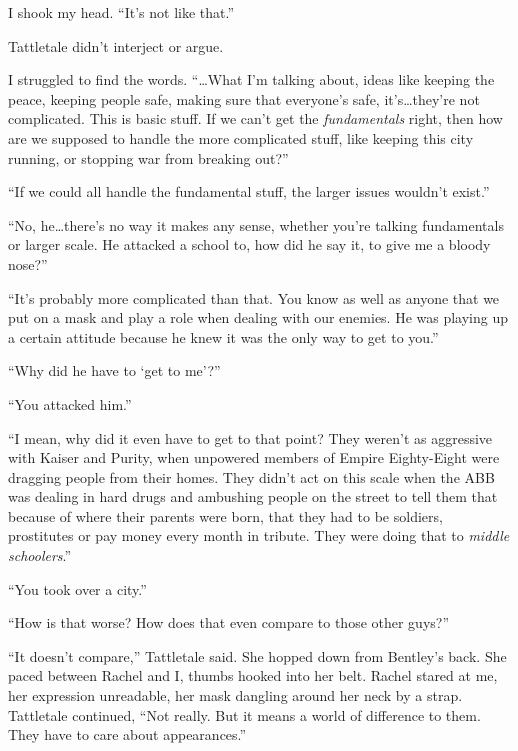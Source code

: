 I shook my head.  ``It's not like that.''



Tattletale didn't interject or argue.



I struggled to find the words.  ``\ldots{}What I'm talking about, ideas like keeping the peace, keeping people safe, making sure that everyone's safe, it's\ldots they're not complicated.  This is basic stuff.  If we can't get the \emph{fundamentals }right, then how are we supposed to handle the more complicated stuff, like keeping this city running, or stopping war from breaking out?''



``If we could all handle the fundamental stuff, the larger issues wouldn't exist.''



``No, he\ldots there's no way it makes any sense, whether you're talking fundamentals or larger scale.  He attacked a school to, how did he say it, to give me a bloody nose?''



``It's probably more complicated than that.  You know as well as anyone that we put on a mask and play a role when dealing with our enemies.  He was playing up a certain attitude because he knew it was the only way to get to you.''



``Why did he have to `get to me'?''



``You attacked him.''



``I mean, why did it even have to get to that point?  They weren't as aggressive with Kaiser and Purity, when unpowered members of Empire Eighty-Eight were dragging people from their homes.  They didn't act on this scale when the ABB was dealing in hard drugs and ambushing people on the street to tell them that because of where their parents were born, that they had to be soldiers, prostitutes or pay money every month in tribute.  They were doing that to \emph{middle schoolers}.''



``You took over a city.''



``How is that worse?  How does that even compare to those other guys?''



``It doesn't compare,'' Tattletale said.  She hopped down from Bentley's back.  She paced between Rachel and I, thumbs hooked into her belt.  Rachel stared at me, her expression unreadable, her mask dangling around her neck by a strap.  Tattletale continued, ``Not really.  But it means a world of difference to them.  They have to care about appearances.''



